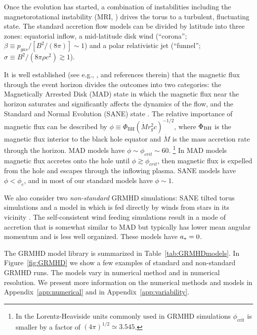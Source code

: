 Once the evolution has started, a combination of instabilities including the magnetorotational instability (MRI, \citealt{1992ApJ...400..610B}) drives the torus to a turbulent, fluctuating state. The standard accretion flow models can be divided by  latitude into three zones: equatorial inflow, a mid-latitude disk wind (``corona''; $\beta \equiv p_{gas}/[B^2/(8\pi)] \sim 1$) and a polar relativistic jet (``funnel''; $\sigma \equiv B^2/(8\pi \rho c^2) \gtrsim 1$).

It is well established (see e.g., ,  and references therein) that the magnetic flux through the event horizon divides the outcomes into two categories: the Magnetically Arrested Disk (MAD) state \citep[e.g.,][]{1974Ap&SS..28...45B, Igumenschchev:2003, 2003PASJ...55L..69N} in which the magnetic flux near the horizon saturates and significantly affects the dynamics of the flow, and the Standard and Normal Evolution (SANE) state \citep[e.g.,][]{2003ApJ...589..444G, devilliers:2003, Narayan:2012}.  The relative importance of magnetic flux can be described by $\phi \equiv \Phi_{\mathrm{BH}} (\dot{M} r_g^2 c)^{-1/2}$, where $\Phi_{\rm BH}$ is the magnetic flux interior to the black hole equator and $\dot{M}$ is the mass accretion rate through the horizon. MAD models have $\phi \sim \phi_{crit} \sim 60$. \footnote{In the Lorentz-Heaviside units commonly used in GRMHD simulations $\phi_\mathrm{crit}$ is smaller by a factor of $(4\pi)^{1/2} \simeq 3.545$.}  In MAD models magnetic flux accretes onto the hole until $\phi \gtrsim \phi_{crit}$, then magnetic flux is expelled from the hole and escapes through the inflowing plasma.  SANE models have $\phi < \phi_c$, and in most of our standard models have $\phi \sim 1$.

We also consider two {\it non-standard} GRMHD simulations: SANE tilted torus simulations \citep{ref} and a model in which \sgra is fed directly by winds from stars in its vicinity \citep{2020ApJ...896L...6R}. The self-consistent wind feeding simulations result in a mode of accretion that is somewhat similar to MAD but typically has lower mean angular momentum and is less well organized.
These models have $a_* = 0$.

The GRMHD model library is summarized in Table~\ref{tab:GRMHDmodels}. In Figure~\ref{fig:GRMHD} we show a few examples of standard and non-standard GRMHD runs. The models vary in numerical method and in numerical resolution. We present more information on the numerical methods and models in Appendix~\ref{app:numerical} and in  Appendix~\ref{app:variability}.

